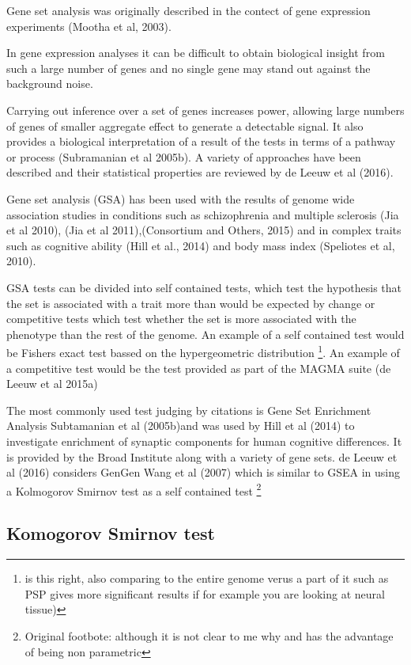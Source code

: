 Gene set analysis was originally described in the contect of gene expression experiments (Mootha et al, 2003).

In gene expression analyses it can be difficult to obtain biological insight from such a large number of genes and no single gene may stand out against the background noise.

Carrying out inference over a set of genes increases power, allowing large numbers of genes of smaller aggregate effect to generate a detectable signal. It also provides a biological interpretation of a result of the tests in terms of a pathway or process (Subramanian et al 2005b). A variety of approaches have been described and their statistical properties are reviewed by de Leeuw et al (2016).

Gene set analysis (GSA) has been used with the results of genome wide association studies in conditions such as schizophrenia and multiple sclerosis (Jia et al 2010), (Jia et al 2011),(Consortium and Others, 2015) and in complex traits such as cognitive ability (Hill et al., 2014) and body mass index (Speliotes et al, 2010).

GSA tests can be divided into self contained tests, which test the hypothesis that the set is associated with a trait more than would be expected by change or competitive tests which test whether the set is more associated with the phenotype than the rest of the genome. An example of a self contained test would be Fishers exact test bassed on the hypergeometric distribution \footnote{is this right, also comparing to the entire genome verus a part of it such as PSP gives more significant results if for example you are looking at neural tissue)}. An example of a competitive test would be the test provided as part of the MAGMA suite (de Leeuw et al 2015a)

The most commonly used test judging by citations is Gene Set Enrichment Analysis Subtamanian et al (2005b)and was used by Hill et al (2014) to investigate enrichment of synaptic components for human cognitive differences. It is provided by the Broad Institute along with a variety of gene sets. de Leeuw et al (2016) considers GenGen Wang et al (2007) which is similar to GSEA in using a Kolmogorov Smirnov test as a self contained test \footnote{Original footbote: although it is not clear to me why and has the advantage of being non parametric}

\subsection{Komogorov Smirnov test}

